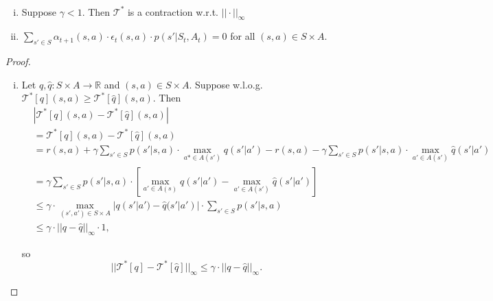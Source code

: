 \begin{lemma}
    \ \vspace{-2em}
    \begin{enumerate}[(i)]
        \item Suppose \( \gamma < 1 \). Then \( \mathcal{T}^* \) is a contraction w.r.t. \( ||\cdot||_{\infty} \)

        \item \( \displaystyle\sum_{s' \in S} \alpha_{t+1}(s,a) \cdot \epsilon_t(s,a) \cdot p(s' | S_t, A_t) = 0 \) for all \( (s,a) \in S \times A \).  
    \end{enumerate}
\end{lemma}

\begin{proof}
    \begin{enumerate}[(i)]
        \item Let \( q, \hat{q}: S \times A \to \mathbb{R} \) and \( (s,a) \in S \times A \). Suppose w.l.o.g. \( \mathcal{T}^* [q] (s,a) \geq \mathcal{T}^*[\hat{q}](s,a) \). Then 
        \begin{align*}
            & |\mathcal{T}^* [q](s,a) - \mathcal{T}^*[\hat{q}](s,a) | \\
            &=  \mathcal{T}^* [q](s,a) - \mathcal{T}^*[\hat{q}](s,a) \\
            &= r(s,a) + \gamma \sum_{s' \in S}p(s' | s,a) \cdot \max_{a* \in A(s')} q(s'|a') - r(s,a) - \gamma \sum_{s' \in S} p(s'|s,a) \cdot \max_{a' \in A(s')} \hat{q}(s'|a')\\
            &= \gamma \sum_{s' \in S} p(s' | s,a) \cdot \left[ \max_{a' \in A(s)} q(s'|a') - \max_{a' \in A(s')}\hat{q}(s'|a')  \right]\\
            &\leq \gamma \cdot \max_{(s',a') \in S \times A} | q(s'|a') - \hat{q}(s'|a')| \cdot \sum_{s' \in S} p(s' | s,a)\\
            &\leq \gamma \cdot ||q-\hat{q}||_{\infty} \cdot 1,
        \end{align*}   

    so 
    \[
        || \mathcal{T}^* [q] - \mathcal{T}^*[\hat{q}]||_{\infty} \leq \gamma \cdot ||q - \hat{q}||_{\infty}.
    \]


\end{enumerate}
\end{proof}
